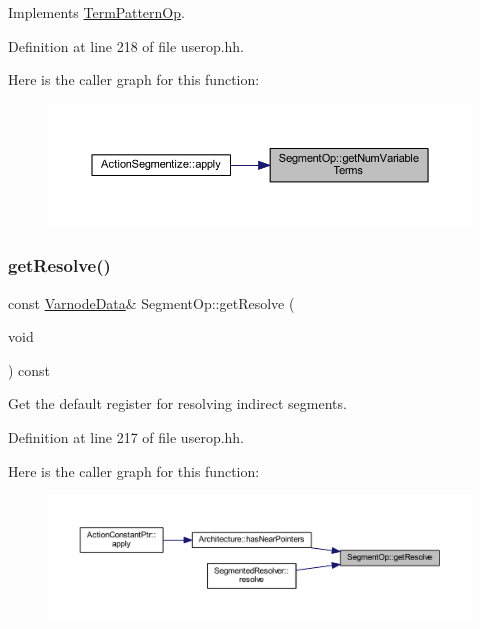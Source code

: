 Implements \mbox{\hyperlink{class_term_pattern_op_a3978a156aa6681432b937361a2294f5d}{Term\+Pattern\+Op}}.



Definition at line 218 of file userop.\+hh.

Here is the caller graph for this function\+:
\nopagebreak
\begin{figure}[H]
\begin{center}
\leavevmode
\includegraphics[width=350pt]{class_segment_op_a0a5b69caea8e60eaebe045f49c9351e1_icgraph}
\end{center}
\end{figure}
\mbox{\label{class_segment_op_aee22fbc6dec027b9cc041c65c9681068}} 
\subsubsection{\texorpdfstring{getResolve()}{getResolve()}}
{\footnotesize\ttfamily const \mbox{\hyperlink{struct_varnode_data}{Varnode\+Data}}\& Segment\+Op\+::get\+Resolve (\begin{DoxyParamCaption}\item[{void}]{ }\end{DoxyParamCaption}) const\hspace{0.3cm}{\ttfamily [inline]}}



Get the default register for resolving indirect segments. 



Definition at line 217 of file userop.\+hh.

Here is the caller graph for this function\+:
\nopagebreak
\begin{figure}[H]
\begin{center}
\leavevmode
\includegraphics[width=350pt]{class_segment_op_aee22fbc6dec027b9cc041c65c9681068_icgraph}
\end{center}
\end{figure}
\mbox{\label{class_segment_op_aad3d01eb19ee086071c27d3c60be0f89}} 
